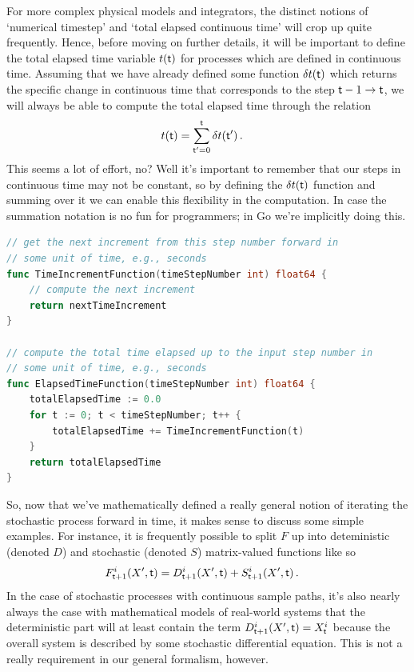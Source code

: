 \documentclass{book}
\begin{document}
For more complex physical models and integrators, the distinct notions of `numerical timestep' and `total elapsed continuous time' will crop up quite frequently. Hence, before moving on further details, it will be important to define the total elapsed time variable $t({\sf t})$ for processes which are defined in continuous time. Assuming that we have already defined some function $\delta t({\sf t})$ which returns the specific change in continuous time that corresponds to the step ${\sf t}-1 \rightarrow {\sf t}$, we will always be able to compute the total elapsed time through the relation
\begin{align}
t({\sf t}) &= \sum^{{\sf t}}_{{\sf t}'=0}\delta t({\sf t}') \label{eq:t-steps-sum} \,.
\end{align}
This seems a lot of effort, no? Well it's important to remember that our steps in continuous time may not be constant, so by defining the $\delta t({\sf t})$ function and summing over it we can enable this flexibility in the computation. In case the summation notation is no fun for programmers; in Go we're implicitly doing this.

\begin{lstlisting}[language=Go]
// get the next increment from this step number forward in
// some unit of time, e.g., seconds
func TimeIncrementFunction(timeStepNumber int) float64 {
    // compute the next increment
    return nextTimeIncrement
}

// compute the total time elapsed up to the input step number in
// some unit of time, e.g., seconds
func ElapsedTimeFunction(timeStepNumber int) float64 {
    totalElapsedTime := 0.0
    for t := 0; t < timeStepNumber; t++ {
        totalElapsedTime += TimeIncrementFunction(t)
    }
    return totalElapsedTime
}
\end{lstlisting}

So, now that we've mathematically defined a really general notion of iterating the stochastic process forward in time, it makes sense to discuss some simple examples. For instance, it is frequently possible to split $F$ up into deteministic (denoted $D$) and stochastic (denoted $S$) matrix-valued functions like so
\begin{align}
& F^{i}_{{\sf t}+1}(X',{\sf t}) = D^{i}_{{\sf t}+1}(X',{\sf t}) + S^{i}_{{\sf t}+1}(X',{\sf t}) \,.
\end{align}
In the case of stochastic processes with continuous sample paths, it's also nearly always the case with mathematical models of real-world systems that the deterministic part will at least contain the term $D^{i}_{{\sf t}+1}(X',{\sf t}) = X^i_{\sf t}$ because the overall system is described by some stochastic differential equation. This is not a really requirement in our general formalism, however.
\end{document}
